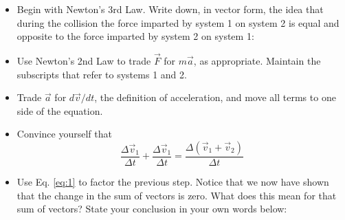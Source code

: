\documentclass{article}
\begin{document}
\begin{itemize}
\item Begin with Newton's 3rd Law.  Write down, in vector form, the idea that during the collision the force imparted by system 1 on system 2 is equal and opposite to the force imparted by system 2 on system 1: \\ \vspace{0.5cm}
\item Use Newton's 2nd Law to trade $\vec{F}$ for $m\vec{a}$, as appropriate.  Maintain the subscripts that refer to systems 1 and 2. \\ \vspace{0.5cm}
\item Trade $\vec{a}$ for $d\vec{v}/dt$, the definition of acceleration, and move all terms to one side of the equation. \\ \vspace{0.5cm}
\item Convince yourself that
\begin{equation}
\frac{\Delta\vec{v}_1}{\Delta t} + \frac{\Delta\vec{v}_1}{\Delta t} = \frac{\Delta (\vec{v}_1 + \vec{v}_2)}{\Delta t} \label{eq:1}
\end{equation}
\item Use Eq. \ref{eq:1} to factor the previous step.  Notice that we now have shown that the change in the sum of vectors is zero.  What does this mean for that sum of vectors?  State your conclusion in your own words below:
\end{itemize}
\end{document}
